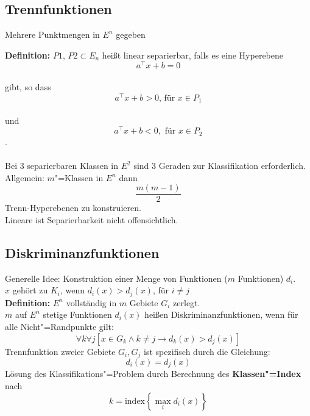 \documentclass[a4paper,12pt]{scrreprt}
\newcommand{\Nb}[1]{\textbf{#1}}
\begin{document}
\subsection{Trennfunktionen}
Mehrere Punktmengen in $E^n$ gegeben

\Nb{Definition:} $P1$, $P2\subset E_n$ heißt linear separierbar, falls es eine Hyperebene\\
$$a^\top x+b=0$$\\
gibt, so dass 
$$a^\top x+b>0 \text{, für }x\in P_1$$\\
und\\ $$a^\top x+b<0, \text{ für } x\in P_2$$.\\
\\
Bei 3 separierbaren Klassen in $E^2$ sind 3 Geraden zur Klassifikation
erforderlich. Allgemein: $m$"=Klassen in $E^n$ dann\\
$$\frac{m(m-1)}{2}$$
Trenn-Hyperebenen zu konstruieren.\\
Lineare ist Separierbarkeit nicht offensichtlich.

\subsection{Diskriminanzfunktionen}
Generelle Idee: Konstruktion einer Menge von Funktionen ($m$
Funktionen) $d_i$.\\ $x$ gehört zu $K_i$, wenn $d_i(x)>d_j(x)$, für
$i\not=j$\\
\Nb{Definition:} $E^n$ vollständig in $m$ Gebiete $G_i$ zerlegt.\\
$m$ auf $E^n$ stetige Funktionen $d_i(x)$ heißen
Diskriminanzfunktionen, wenn für alle Nicht"=Randpunkte gilt:\\
$$\forall k \forall j \left[ x\in G_k \land k\not=j \to
	d_k(x)>d_j(x) \right]$$
Trennfunktion zweier Gebiete $G_i, G_j$ ist spezifisch durch die Gleichung:
$$d_i(x) = d_j(x)$$
Lösung des Klassifikations"=Problem durch Berechnung des
\Nb{Klassen"=Index} nach $$k=\text{index}\left\{\max\limits_i{d_i(x)}  \right\}$$
\end{document}
